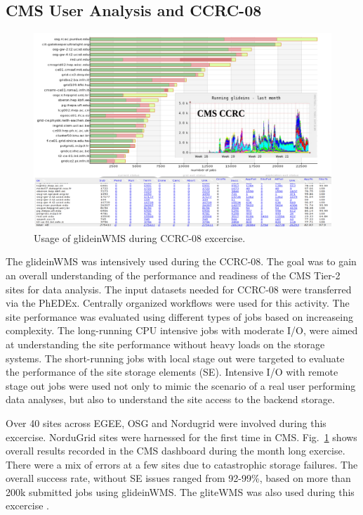 \documentclass[a4paper]{jpconf}
\begin{document}
\subsection{CMS User Analysis and CCRC-08}
\begin{figure}
\begin{center}
\includegraphics[scale=0.55]{glideins_ccrc08}
\end{center}
\caption{Usage of glideinWMS during CCRC-08 excercise.}
\label{fig:glideins_ccrc}
\end{figure}
The glideinWMS was intensively used during the CCRC-08. The goal was to gain an overall understanding 
of the performance and readiness of the CMS Tier-2 sites for data analysis. The input datasets needed for CCRC-08 were transferred
via the PhEDEx. Centrally organized workflows were used for this activity. The site performance
was evaluated using different types of jobs based on increaseing complexity. The long-running 
CPU intensive jobs with moderate I/O, were aimed at understanding the site performance without
heavy loads on the storage systems. The short-running jobs with local stage out were targeted
to evaluate the performance of the site storage elements (SE). Intensive I/O with remote stage out
jobs were used not only to mimic the scenario of a real user performing data analyses, but also
to understand the site access to the backend storage.

Over 40 sites across EGEE, OSG and Nordugrid were involved during this excercise. NorduGrid sites 
were harnessed for the first time in CMS. Fig.~\ref{fig:glideins_ccrc} shows overall results recorded in the CMS dashboard 
during the month long exercise. There were a mix of errors at a few sites due to catastrophic storage 
failures. The overall success rate, without SE issues ranged from 92-99\%, based on more than 200k 
submitted jobs using glideinWMS. The gliteWMS was also used during this excercise \cite{bib:cms_glite}.
\end{document}
